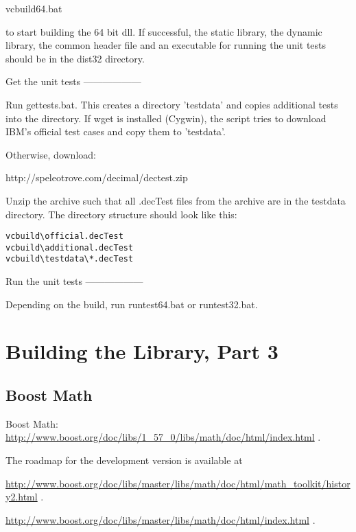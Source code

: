 vcbuild64.bat

to start building the 64 bit dll. If successful, the static library, the dynamic
library, the common header file and an executable for running the
unit tests should be in the dist32 directory.





Get the unit tests
------------------

Run gettests.bat. This creates a directory 'testdata' and copies
additional tests into the directory. If wget is installed (Cygwin),
the script tries to download IBM's official test cases and copy them
to 'testdata'.

Otherwise, download:

http://speleotrove.com/decimal/dectest.zip

Unzip the archive such that all .decTest files from the archive are in
the testdata directory. The directory structure should look like this:

\begin{verbatim}
vcbuild\official.decTest
vcbuild\additional.decTest
vcbuild\testdata\*.decTest
\end{verbatim}

Run the unit tests
------------------

Depending on the build, run runtest64.bat or runtest32.bat.






\newpage
\section{Building the Library, Part 3}


\subsection{Boost Math}
Boost Math: \href{http://www.boost.org/doc/libs/1_57_0/libs/math/doc/html/index.html}{http://www.boost.org/doc/libs/1\_57\_0/libs/math/doc/html/index.html} . 

The roadmap for the development version is available at

\href{http://www.boost.org/doc/libs/master/libs/math/doc/html/math_toolkit/history2.html}{http://www.boost.org/doc/libs/master/libs/math/doc/html/math\_toolkit/history2.html} . 

\href{http://www.boost.org/doc/libs/master/libs/math/doc/html/index.html}{http://www.boost.org/doc/libs/master/libs/math/doc/html/index.html} . 

